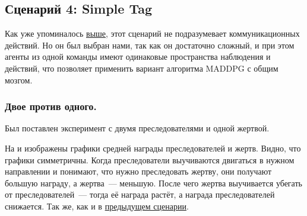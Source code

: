 \subsection{Сценарий 4: Simple Tag}

Как уже упоминалось \hyperref[exp-st]{выше}, этот сценарий не подразумевает коммуникационных действий. Но он был выбран нами, так как он достаточно сложный, и при этом агенты из одной команды имеют одинаковые пространства наблюдения и действий, что позволяет применить вариант алгоритма MADDPG с общим мозгом.

\subsubsection{Двое против одного.}

Был поставлен эксперимент с двумя преследователями и одной жертвой.

На  и  изображены графики средней награды преследователей и жертв. Видно, что графики симметричны. Когда преследователи выучиваются двигаться в нужном направлении и понимают, что нужно преследовать жертву, они получают большую награду, а жертва~--- меньшую. После чего жертва выучивается убегать от преследователей~--- тогда её награда растёт, а награда преследователей снижается. Так же, как и в \hyperref[exp-results-svc]{предыдущем сценарии}.

